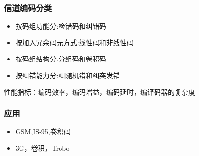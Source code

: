 \subsubsection{信道编码分类}
\begin{itemize}
	\item 按码组功能分:检错码和纠错码
	\item 按加入冗余码元方式:线性码和非线性码
	\item 按码组结构分:分组码和卷积码
	\item  按纠错能力分:纠随机错和纠突发错
	
\end{itemize}
性能指标：编码效率，编码增益，编码延时，编译码器的复杂度
\subsubsection{应用}
\begin{itemize}
	\item GSM,IS-95,卷积码
	\item 3G，卷积，Trobo
\end{itemize}
